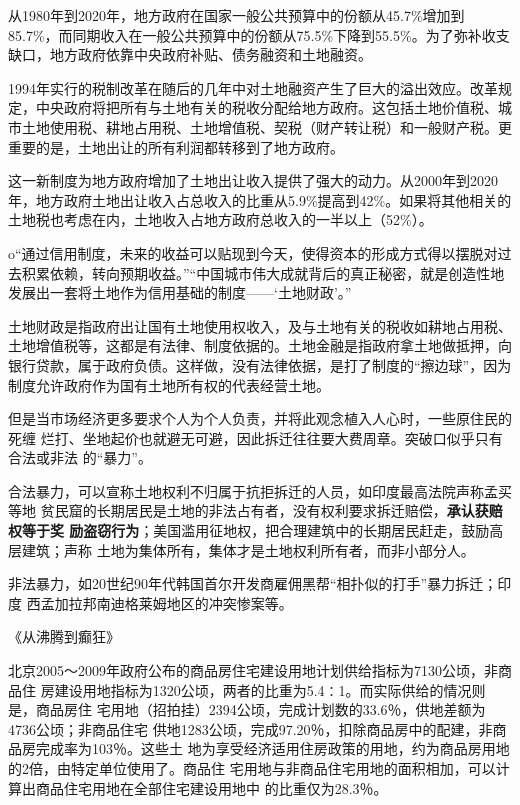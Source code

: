 从1980年到2020年，地方政府在国家一般公共预算中的份额从45.7\%增加到85.7\%，而同期收入在一般公共预算中的份额从75.5\%下降到55.5\%。为了弥补收支缺口，地方政府依靠中央政府补贴、债务融资和土地融资。

1994年实行的税制改革在随后的几年中对土地融资产生了巨大的溢出效应。改革规定，中央政府将把所有与土地有关的税收分配给地方政府。这包括土地价值税、城市土地使用税、耕地占用税、土地增值税、契税（财产转让税）和一般财产税。更重要的是，土地出让的所有利润都转移到了地方政府。

这一新制度为地方政府增加了土地出让收入提供了强大的动力。从2000年到2020年，地方政府土地出让收入占总收入的比重从5.9\%提高到42\%。如果将其他相关的土地税也考虑在内，土地收入占地方政府总收入的一半以上（52\%）。

o“通过信用制度，未来的收益可以贴现到今天，使得资本的形成方式得以摆脱对过去积累依赖，转向预期收益。”“中国城市伟大成就背后的真正秘密，就是创造性地发展出一套将土地作为信用基础的制度——‘土地财政’。”


土地财政是指政府出让国有土地使用权收入，及与土地有关的税收如耕地占用税、土地增值税等，这都是有法律、制度依据的。土地金融是指政府拿土地做抵押，向银行贷款，属于政府负债。这样做，没有法律依据，是打了制度的“擦边球”，因为制度允许政府作为国有土地所有权的代表经营土地。


但是当市场经济更多要求个人为个人负责，并将此观念植入人心时，一些原住民的死缠
烂打、坐地起价也就避无可避，因此拆迁往往要大费周章。突破口似乎只有合法或非法
的“暴力”。

合法暴力，可以宣称土地权利不归属于抗拒拆迁的人员，如印度最高法院声称孟买等地
贫民窟的长期居民是土地的非法占有者，没有权利要求拆迁赔偿，\textbf{承认获赔权等于奖
励盗窃行为}；美国滥用征地权，把合理建筑中的长期居民赶走，鼓励高层建筑；声称
土地为集体所有，集体才是土地权利所有者，而非小部分人。

非法暴力，如20世纪90年代韩国首尔开发商雇佣黑帮“相扑似的打手”暴力拆迁；印度
西孟加拉邦南迪格莱姆地区的冲突惨案等。


《从沸腾到癫狂》

北京2005～2009年政府公布的商品房住宅建设用地计划供给指标为7130公顷，非商品住
房建设用地指标为1320公顷，两者的比重为5.4∶1。而实际供给的情况则是，商品房住
宅用地（招拍挂）2394公顷，完成计划数的33.6％，供地差额为4736公顷；非商品住宅
供地1283公顷，完成97.20％，扣除商品房中的配建，非商品房完成率为103％。这些土
地为享受经济适用住房政策的用地，约为商品房用地的2倍，由特定单位使用了。商品住
宅用地与非商品住宅用地的面积相加，可以计算出商品住宅用地在全部住宅建设用地中
的比重仅为28.3％。



